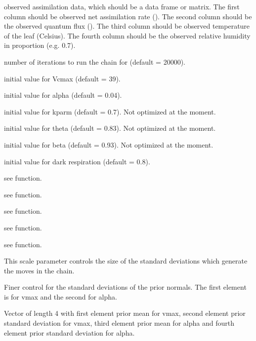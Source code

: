 \documentclass[letterpaper]{book}
\begin{document}
%
\begin{Arguments}
\begin{ldescription}
\item[\code{data}] observed assimilation data, which should be a
data frame or matrix.  The first column should be
observed net assimilation rate ().  The
second column should be the observed quantum flux
().  The third column should be observed
temperature of the leaf (Celsius).  The fourth column
should be the observed relative humidity in proportion
(e.g. 0.7).

\item[\code{niter}] number of iterations to run the chain for
(default = 20000).

\item[\code{ivmax}] initial value for Vcmax (default = 39).

\item[\code{ialpha}] initial value for alpha (default = 0.04).

\item[\code{ikparm}] initial value for kparm (default = 0.7).
Not optimized at the moment.

\item[\code{itheta}] initial value for theta (default = 0.83).
Not optimized at the moment.

\item[\code{ibeta}] initial value for beta (default = 0.93). Not
optimized at the moment.

\item[\code{iRd}] initial value for dark respiration (default =
0.8).

\item[\code{Catm}] see  function.

\item[\code{b0}] see  function.

\item[\code{b1}] see  function.

\item[\code{StomWS}] see  function.

\item[\code{ws}] see  function.

\item[\code{scale}] This scale parameter controls the size of
the standard deviations which generate the moves in the
chain.

\item[\code{sds}] Finer control for the standard deviations of
the prior normals. The first element is for vmax and the
second for alpha.

\item[\code{prior}] Vector of length 4 with first element prior
mean for vmax, second element prior standard deviation
for vmax, third element prior mean for alpha and fourth
element prior standard deviation for alpha.
\end{ldescription}
\end{Arguments}
\end{document}
